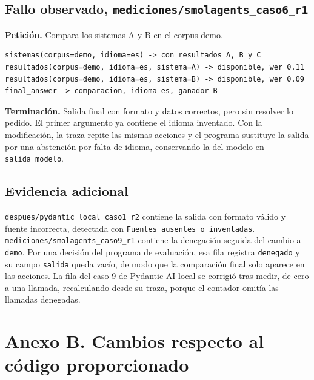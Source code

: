 \subsection*{Fallo observado, \texttt{mediciones/smolagents\_caso6\_r1}}
\textbf{Petición.} Compara los sistemas A y B en el corpus demo.
\begin{verbatim}
sistemas(corpus=demo, idioma=es) -> con_resultados A, B y C
resultados(corpus=demo, idioma=es, sistema=A) -> disponible, wer 0.11
resultados(corpus=demo, idioma=es, sistema=B) -> disponible, wer 0.09
final_answer -> comparacion, idioma es, ganador B
\end{verbatim}
\textbf{Terminación.} Salida final con formato y datos correctos, pero sin resolver lo pedido. El primer argumento ya contiene el idioma inventado. Con la modificación, la traza  repite las mismas acciones y el programa sustituye la salida por una abstención por falta de idioma, conservando la del modelo en \texttt{salida\_modelo}.

\subsection*{Evidencia adicional}
\texttt{despues/pydantic\_local\_caso1\_r2} contiene la salida con formato válido y fuente incorrecta, detectada con \texttt{Fuentes ausentes o inventadas}. \texttt{mediciones/smolagents\_caso9\_r1} contiene la denegación seguida del cambio a \texttt{demo}. Por una decisión del programa de evaluación, esa fila registra \texttt{denegado} y su campo \texttt{salida} queda vacío, de modo que la comparación final solo aparece en las acciones. La fila del caso 9 de Pydantic AI local se corrigió tras medir, de cero a una llamada, recalculando desde su traza, porque el contador omitía las llamadas denegadas.

\section*{Anexo B. Cambios respecto al código proporcionado}

